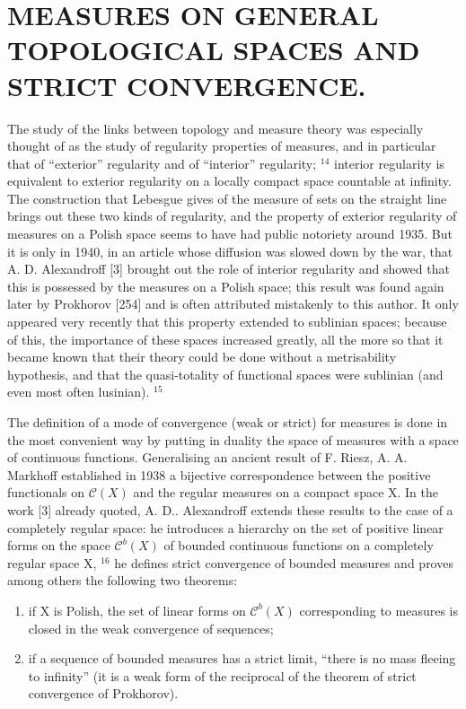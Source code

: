 \section*{MEASURES ON GENERAL TOPOLOGICAL SPACES AND STRICT CONVERGENCE.}
{}

The study of the links between topology and measure theory was especially thought of as the study of regularity properties of measures, and in particular that of ``exterior'' regularity and of ``interior'' regularity; \(^{14}\) interior regularity is equivalent to exterior regularity on a locally compact space countable at infinity. The construction that Lebesgue gives of the measure of sets on the straight line brings out these two kinds of regularity, and the property of exterior regularity of measures on a Polish space seems to have had public notoriety around 1935. But it is only in 1940, in an article whose diffusion was slowed down by the war, that A. D. Alexandroff {[}3{]} brought out the role of interior regularity and showed that this is possessed by the measures on a Polish space; this result was found again later by Prokhorov {[}254{]} and is often attributed mistakenly to this author. It only appeared very recently that this property extended to sublinian spaces; because of this, the importance of these spaces increased greatly, all the more so that it became known that their theory could be done without a metrisability hypothesis, and that the quasi-totality of functional spaces were sublinian (and even most often lusinian). \(^{15}\)

The definition of a mode of convergence (weak or strict) for measures is done in the most convenient way by putting in duality the space of measures with a space of continuous functions. Generalising an ancient result of F. Riesz, A. A. Markhoff established in 1938 a bijective correspondence between the positive functionals on \(\mathcal{C}(X)\) and the regular measures on a compact space X. In the work {[}3{]} already quoted, A. D.. Alexandroff extends these results to the case of a completely regular space: he introduces a hierarchy on the set of positive linear forms on the space \(\mathcal{C}^{b}(X)\) of bounded continuous functions on a completely regular space X, \(^{16}\) he defines strict convergence of bounded measures and proves among others the following two theorems:

\begin{enumerate}
\def\labelenumi{\alph{enumi})}
\item
  if X is Polish, the set of linear forms on \(\mathcal{C}^{b}(X)\) corresponding to measures is closed in the weak convergence of sequences;
\item
  if a sequence of bounded measures has a strict limit, ``there is no mass fleeing to infinity'' (it is a weak form of the reciprocal of the theorem of strict convergence of Prokhorov).
\end{enumerate}

